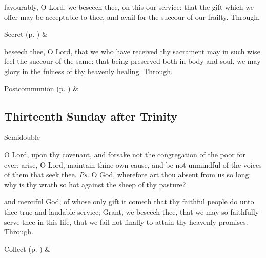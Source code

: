 
\secret
{} favourably, O Lord, we beseech thee, on this our service: that the gift which we offer may be acceptable to thee, and avail for the succour of our frailty. Through.
\begin{rubric}
     Secret  (p. \pageref{SPSaints}) \&  
\end{rubric}


\postcommunion
{} beseech thee, O Lord, that we who have received thy sacrament may in such wise feel the succour of the same: that being preserved both in body and soul, we may glory in the fulness of thy heavenly healing. Through.
\begin{rubric}
     Postcommunion  (p. \pageref{SPSaints}) \&  
\end{rubric}


\clearpage
\subsection{Thirteenth Sunday after Trinity}
\begin{inhead}
{Semidouble}
\end{inhead}


\introit
{} O Lord, upon thy covenant, and forsake not the congregation of the poor for ever: arise, O Lord, maintain thine own cause, and be not unmindful of the voices of them that seek thee. \textit{Ps.} O God, wherefore art thou absent from us so long: why is thy wrath so hot against the sheep of thy pasture?

\collect
{} and merciful God, of whose only gift it cometh that thy faithful people do unto thee true and laudable service; Grant, we beseech thee, that we may so faithfully serve thee in this life, that we fail not finally to attain thy heavenly promises. Through.
\begin{rubric}
     Collect  (p. \pageref{SPSaints}) \&  
\end{rubric}

